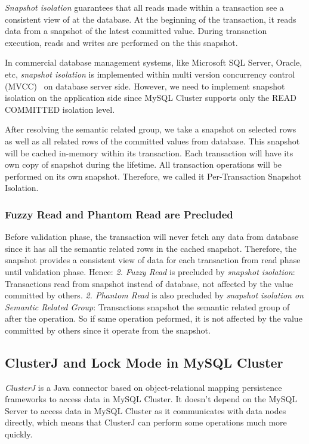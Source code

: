\documentclass[runningheads,a4paper]{llncs}
\begin{document}
\textit{Snapshot isolation} guarantees that all reads made within a transaction see a consistent view of at the database. At the beginning of the transaction, it reads data from a snapshot of the latest committed value. During transaction execution, reads and writes are performed on the this snapshot.

In commercial database management systems, like Microsoft SQL Server, Oracle, etc, \textit{snapshot isolation} is implemented within multi version concurrency control (MVCC)~\cite{berenson1995critique} on database server side. However, we need to implement snapshot isolation on the application side since MySQL Cluster supports only the READ COMMITTED isolation level.

After resolving the semantic related group, we take a snapshot on selected rows as well as all related rows of the committed values from database. This snapshot will be cached in-memory within its transaction. Each transaction will have its own copy of snapshot during the lifetime. All transaction operations will be performed on its own snapshot. Therefore, we called it Per-Transaction Snapshot Isolation.

\subsubsection{Fuzzy Read and Phantom Read are Precluded}
Before validation phase, the transaction will never fetch any data from database since it has all the semantic related rows in the cached snapshot. Therefore, the snapshot provides a consistent view of data for each transaction from read phase until validation phase. Hence: \textit{2. Fuzzy Read} is precluded by \textit{snapshot isolation}: Transactions read from snapshot instead of database, not affected by the value committed by others. \textit{2. Phantom Read} is also precluded by \textit{snapshot isolation on Semantic Related Group}: Transactions snapshot the semantic related group of after the operation. So if same operation peformed, it is not affected by the value committed by others since it operate from the snapshot.

\subsection{ClusterJ and Lock Mode in MySQL Cluster}
\textit{ClusterJ} is a Java connector based on object-relational mapping persistence frameworks to access data in MySQL Cluster. It doesn't depend on the MySQL Server to access data in MySQL Cluster as it communicates with data nodes directly, which means that ClusterJ can perform some operations much more quickly. 
\end{document}
